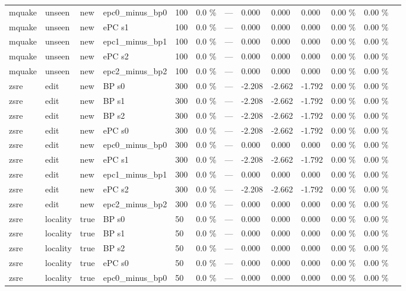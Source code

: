 \documentclass[10pt,a4paper]{article}
\begin{document}
\begin{center}
\begin{tabularx}{\textwidth}{@{}p{}XXXXXXXXXXXX@{}}
mquake & unseen & new & epc0\_minus\_bp0 & 100 & 0.0 \% & — & 0.000 & 0.000 & 0.000 & 0.00 \% & 0.00 \% &  \\
mquake & unseen & new & ePC s1 & 100 & 0.0 \% & — & 0.000 & 0.000 & 0.000 & 0.00 \% & 0.00 \% &  \\
mquake & unseen & new & epc1\_minus\_bp1 & 100 & 0.0 \% & — & 0.000 & 0.000 & 0.000 & 0.00 \% & 0.00 \% &  \\
mquake & unseen & new & ePC s2 & 100 & 0.0 \% & — & 0.000 & 0.000 & 0.000 & 0.00 \% & 0.00 \% &  \\
mquake & unseen & new & epc2\_minus\_bp2 & 100 & 0.0 \% & — & 0.000 & 0.000 & 0.000 & 0.00 \% & 0.00 \% &  \\
zsre & edit & new & BP s0 & 300 & 0.0 \% & — & -2.208 & -2.662 & -1.792 & 0.00 \% & 0.00 \% &  \\
zsre & edit & new & BP s1 & 300 & 0.0 \% & — & -2.208 & -2.662 & -1.792 & 0.00 \% & 0.00 \% &  \\
zsre & edit & new & BP s2 & 300 & 0.0 \% & — & -2.208 & -2.662 & -1.792 & 0.00 \% & 0.00 \% &  \\
zsre & edit & new & ePC s0 & 300 & 0.0 \% & — & -2.208 & -2.662 & -1.792 & 0.00 \% & 0.00 \% &  \\
zsre & edit & new & epc0\_minus\_bp0 & 300 & 0.0 \% & — & 0.000 & 0.000 & 0.000 & 0.00 \% & 0.00 \% &  \\
zsre & edit & new & ePC s1 & 300 & 0.0 \% & — & -2.208 & -2.662 & -1.792 & 0.00 \% & 0.00 \% &  \\
zsre & edit & new & epc1\_minus\_bp1 & 300 & 0.0 \% & — & 0.000 & 0.000 & 0.000 & 0.00 \% & 0.00 \% &  \\
zsre & edit & new & ePC s2 & 300 & 0.0 \% & — & -2.208 & -2.662 & -1.792 & 0.00 \% & 0.00 \% &  \\
zsre & edit & new & epc2\_minus\_bp2 & 300 & 0.0 \% & — & 0.000 & 0.000 & 0.000 & 0.00 \% & 0.00 \% &  \\
zsre & locality & true & BP s0 & 50 & 0.0 \% & — & 0.000 & 0.000 & 0.000 & 0.00 \% & 0.00 \% &  \\
zsre & locality & true & BP s1 & 50 & 0.0 \% & — & 0.000 & 0.000 & 0.000 & 0.00 \% & 0.00 \% &  \\
zsre & locality & true & BP s2 & 50 & 0.0 \% & — & 0.000 & 0.000 & 0.000 & 0.00 \% & 0.00 \% &  \\
zsre & locality & true & ePC s0 & 50 & 0.0 \% & — & 0.000 & 0.000 & 0.000 & 0.00 \% & 0.00 \% &  \\
zsre & locality & true & epc0\_minus\_bp0 & 50 & 0.0 \% & — & 0.000 & 0.000 & 0.000 & 0.00 \% & 0.00 \% &  \\

\end{tabularx}
\end{center}
\end{document}
